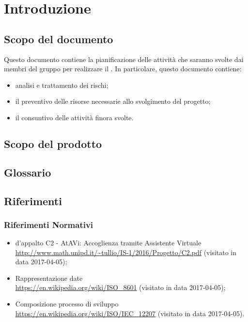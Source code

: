 \section{Introduzione}
	\subsection{Scopo del documento}
	Questo documento contiene la pianificazione delle attività che saranno svolte dai membri del gruppo \GRUPPO{} per realizzare il  \PROGETTO. In particolare, questo documento contiene:
	\begin{itemize}
		\item analisi e trattamento dei rischi;
		\item il preventivo delle risorse necessarie allo svolgimento del progetto;
		\item il consuntivo delle attività finora svolte.
	\end{itemize}	
	\subsection{Scopo del prodotto}
		\SCOPO
	\subsection{Glossario}
		\GLOSSARIO
	\subsection{Riferimenti}
	\subsubsection{Riferimenti Normativi}
		\begin{itemize}
			\item {} d'appalto C2 - AtAVi: Accoglienza tramite Assistente Virtuale \\
			\url{http://www.math.unipd.it/~tullio/IS-1/2016/Progetto/C2.pdf} (visitato in data 2017-04-05);
			\item Rappresentazione date \\
			\url{https://en.wikipedia.org/wiki/ISO_8601} (visitato in data 2017-04-05);
			\item Composizione processo di sviluppo \\
			\url{https://en.wikipedia.org/wiki/ISO/IEC_12207} (visitato in data 2017-04-05).

	\end{itemize}
